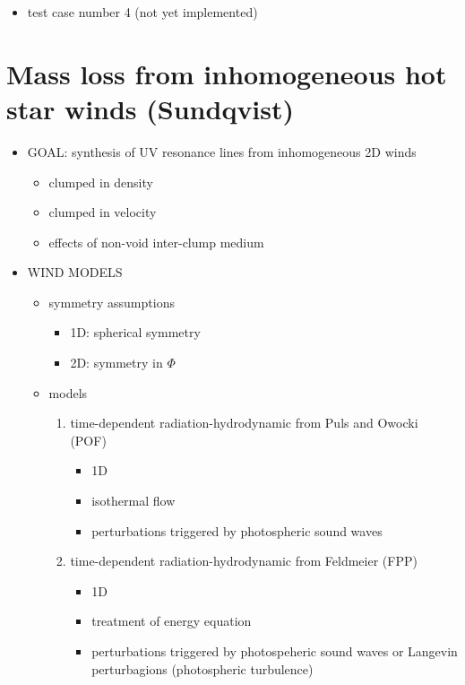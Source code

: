 \documentclass[../main/main.tex]{subfiles}
\begin{document}
\begin{itemize}
\item test case number 4 (not yet implemented)
\end{itemize}


\newpage
\section{Mass loss from inhomogeneous hot star winds (Sundqvist)}
\begin{itemize}
\item GOAL: synthesis of UV resonance lines from inhomogeneous 2D winds
\begin{itemize}
\item clumped in density
\item clumped in velocity
\item effects of non-void inter-clump medium
\end{itemize}

\item WIND MODELS
\begin{itemize}
\item symmetry assumptions
\begin{itemize}
\item 1D: spherical symmetry
\item 2D: symmetry in $\Phi$
\end{itemize}

\item models
\begin{enumerate}

\item time-dependent radiation-hydrodynamic from Puls and Owocki (POF)
\begin{itemize}
\item 1D
\item isothermal flow
\item perturbations triggered by photospheric sound waves
\end{itemize}

\item time-dependent radiation-hydrodynamic from Feldmeier (FPP)
\begin{itemize}
\item 1D
\item treatment of energy equation
\item perturbations triggered by photospeheric sound waves or Langevin perturbagions (photospheric turbulence)
\end{itemize}


\end{enumerate}
\end{itemize}
\end{itemize}
\end{document}
